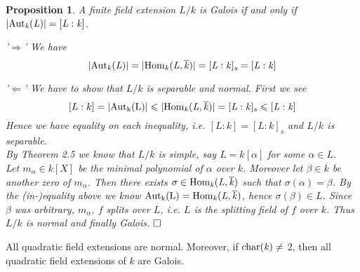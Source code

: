 \documentclass[11pt]{book}
\newtheorem{proposition}[theorem]{Proposition}
\theoremstyle{nonumberbreak}
\newenvironment{pr}[1][]{\ifthenelse{\equal{#1}{}}{\proof}{\proof[#1]}\rm}{\endproof}
\newenvironment{ex}[1][]{\ifthenelse{\equal{#1}{}}{\example}{\example[#1]}\rm}{\endexample}
\begin{document}
\begin{spacing}{1.3}
\begin{proposition} %
A finite field extension $L/k$ is Galois if and only if $\vert \rm{Aut}\it_{k}(L) \vert=[L:k]$.
\begin{pr}
\begin{compactitem}
\item['$\Rightarrow$'] We have
$$ \vert \rm{Aut}\it_{k}(L) \vert = \vert \rm{Hom}\it_{k}(L, \overline{k}) \vert = [L:k]_s=[L:k]$$
\item['$\Leftarrow$'] We have to show that $L/k$ is separable and normal. First we see
$$[L:k]= \vert \rm{Aut}_{k}(L) \vert \leqslant \vert \rm{Hom}\it_{k}(L, \overline{k}) \vert = [L:k]_s \leqslant [L:k]$$
Hence we have equality on each inequality, i.e. $[L:k]=[L:k]_s$ and $L/k$ is separable.\\
By Theorem 2.5 we know that $L/k$ is simple, say $L=k[\alpha]$ for some $\alpha \in L$.\\Let $m_{\alpha} \in k[X]$ be the minimal polynomial of $\alpha$ over $k$. Moreover let $\beta \in \overline{k}$ be another zero of $m_{\alpha}$. Then there exists $\sigma \in \rm{Hom}\it_{k}(L, \overline{k})$ such that $\sigma(\alpha)=\beta$. By the (in-)equality above we know $\rm{Aut}_{k}(L)=\rm{Hom}\it_{k}(L, \overline{k})$, hence $\sigma(\beta) \in L$. Since $\beta$ was arbitrary, $m_{\alpha}$, $f$ splits over $L$, i.e. $L$ is the splitting field of $f$ over $k$. Thus $L/k$ is normal and finally Galois. $\hfill \Box$
\end{compactitem}
\end{pr}
\end{proposition}

\begin{ex}   %
All quadratic field extensions are normal. Moreover, if $\rm{char}\it(k) \neq$ $2$, then all quadratic field extensions of $k$ are Galois. \end{ex}


\end{spacing}
\end{document}

